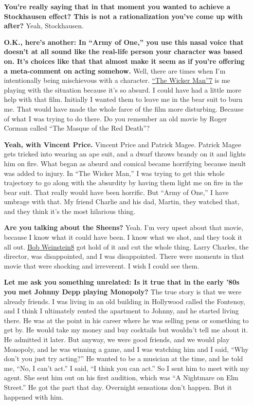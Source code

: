\textbf{You're really saying that in that moment you wanted to achieve a
Stockhausen effect? This is not a rationalization you've come up with
after?} Yeah, Stockhausen.

\textbf{O.K., here's another: In ``Army of One,'' you use this nasal
voice that doesn't at all sound like the real-life person your character
was based on. It's choices like that that almost make it seem as if
you're offering a meta-comment on acting somehow.} Well, there are times
when I'm intentionally being mischievous with a character.
\href{http://nytimes3xbfgragh.onion\#tooltip-7}{``The Wicker
Man''}\href{http://nytimes3xbfgragh.onion\#tooltip-7}{7} is me playing
with the situation because it's so absurd. I could have had a little
more help with that film. Initially I wanted them to leave me in the
bear suit to burn me. That would have made the whole farce of the film
more disturbing. Because of what I was trying to do there. Do you
remember an old movie by Roger Corman called ``The Masque of the Red
Death''?

\textbf{Yeah, with Vincent Price.} Vincent Price and Patrick Magee.
Patrick Magee gets tricked into wearing an ape suit, and a dwarf throws
brandy on it and lights him on fire. What began as absurd and comical
became horrifying because insult was added to injury. In ``The Wicker
Man,'' I was trying to get this whole trajectory to go along with the
absurdity by having them light me on fire in the bear suit. That really
would have been horrific. But ``Army of One,'' I have umbrage with that.
My friend Charlie and his dad, Martin, they watched that, and they think
it's the most hilarious thing.

\textbf{Are you talking about the Sheens?} Yeah. I'm very upset about
that movie, because I know what it could have been. I know what we shot,
and they took it all out.
\href{http://nytimes3xbfgragh.onion\#tooltip-8}{Bob Weinstein8} got hold
of it and cut the whole thing. Larry Charles, the director, was
disappointed, and I was disappointed. There were moments in that movie
that were shocking and irreverent. I wish I could see them.

\textbf{Let me ask you something unrelated: Is it true that in the early
'80s you met Johnny Depp playing Monopoly?} The true story is that we
were already friends. I was living in an old building in Hollywood
called the Fontenoy, and I think I ultimately rented the apartment to
Johnny, and he started living there. He was at the point in his career
where he was selling pens or something to get by. He would take my money
and buy cocktails but wouldn't tell me about it. He admitted it later.
But anyway, we were good friends, and we would play Monopoly, and he was
winning a game, and I was watching him and I said, ``Why don't you just
try acting?'' He wanted to be a musician at the time, and he told me,
``No, I can't act.'' I said, ``I think you can act.'' So I sent him to
meet with my agent. She sent him out on his first audition, which was
``A Nightmare on Elm Street.'' He got the part that day. Overnight
sensations don't happen. But it happened with him.

